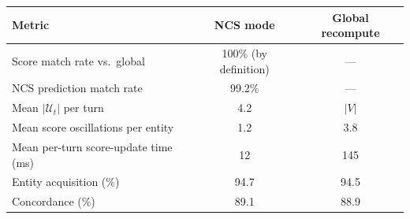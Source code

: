 \begin{tabular}{@{}lcc@{}}
\toprule
\textbf{Metric} & \textbf{NCS mode} & \textbf{Global recompute} \\
\midrule
Score match rate vs.\ global  & 100\% (by definition) & --- \\
NCS prediction match rate     & 99.2\% & --- \\
Mean $|\mathcal{U}_t|$ per turn & 4.2 & $|V|$ \\
Mean score oscillations per entity & 1.2 & 3.8 \\
Mean per-turn score-update time (ms) & 12 & 145 \\
Entity acquisition (\%)       & 94.7 & 94.5 \\
Concordance (\%)              & 89.1 & 88.9 \\
\bottomrule
\end{tabular}